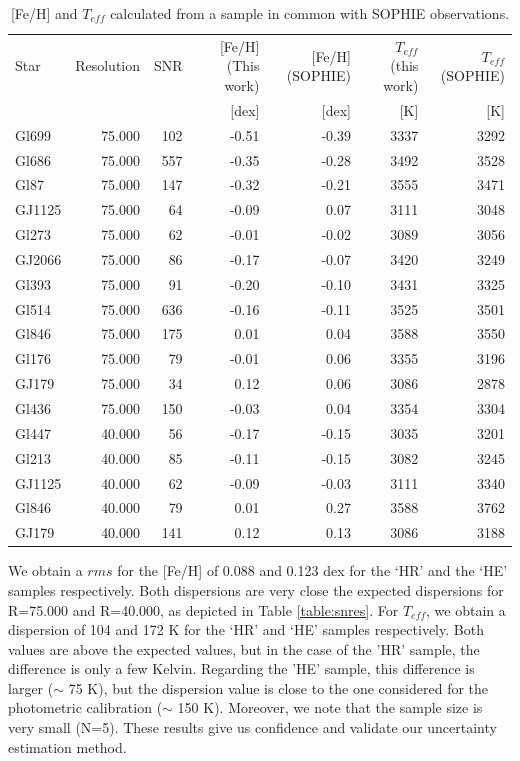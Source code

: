 \documentclass[referee]{aa}
\begin{document}
\begin{table}[]
\centering
\caption[]{[Fe/H] and $T_{eff}$ calculated from a sample in common with SOPHIE observations.}
\label{table:sophie}
\begin{center}
\begin{tabular}{l r r r r r r}
\hline
\hline
Star & Resolution & SNR & [Fe/H] (This work) & [Fe/H] (SOPHIE) & $T_{eff}$ (this work) & $T_{eff}$ (SOPHIE) \\
     &            &     &  [dex] & [dex]       &  [K] & [K]       \\
\hline
Gl699 & 75.000 & 102 & -0.51 & -0.39 & 3337 & 3292 \\
Gl686 & 75.000 & 557 & -0.35 & -0.28 & 3492 & 3528 \\
Gl87 & 75.000 & 147 & -0.32 & -0.21 & 3555 & 3471 \\
GJ1125 & 75.000 & 64 & -0.09 & 0.07 & 3111 & 3048 \\
Gl273 & 75.000 & 62 & -0.01 & -0.02 & 3089 & 3056 \\
GJ2066 & 75.000 & 86 & -0.17 & -0.07 & 3420 & 3249 \\
Gl393 & 75.000 & 91 & -0.20 & -0.10 & 3431 & 3325 \\
Gl514 & 75.000 & 636 & -0.16 & -0.11 & 3525 & 3501 \\
Gl846 & 75.000 & 175 & 0.01 & 0.04 & 3588 & 3550 \\
Gl176 & 75.000 & 79 & -0.01 & 0.06 & 3355 & 3196 \\
GJ179 & 75.000 & 34 & 0.12 & 0.06 & 3086 & 2878 \\
Gl436 & 75.000 & 150 & -0.03 & 0.04 & 3354 & 3304 \\
Gl447 & 40.000 & 56 & -0.17 & -0.15 & 3035 & 3201 \\
Gl213 & 40.000 & 85 & -0.11 & -0.15 & 3082 & 3245 \\
GJ1125 & 40.000 & 62 & -0.09 & -0.03 & 3111 & 3340 \\
Gl846 & 40.000 & 79 & 0.01 & 0.27 & 3588 & 3762 \\
GJ179 & 40.000 & 141 & 0.12 & 0.13 & 3086 & 3188 \\
\hline
\end{tabular}
\end{center}
\end{table}

We obtain a $rms$ for the [Fe/H] of 0.088 and 0.123 dex for the `HR' and the `HE' samples respectively. Both dispersions are very close the expected dispersions for R=75.000 and R=40.000, as depicted in Table \ref{table:snres}. For $T_{eff}$, we obtain a dispersion of 104 and 172 K for the `HR' and `HE' samples respectively. Both values are above the expected values, but in the case of the 'HR' sample, the difference is only a few Kelvin. Regarding the 'HE' sample, this difference is larger ($\sim$ 75 K), but the dispersion value is close to the one considered for the photometric calibration ($\sim$ 150 K). Moreover, we note that the sample size is very small (N=5). These results give us confidence and validate our uncertainty estimation method.
\end{document}
